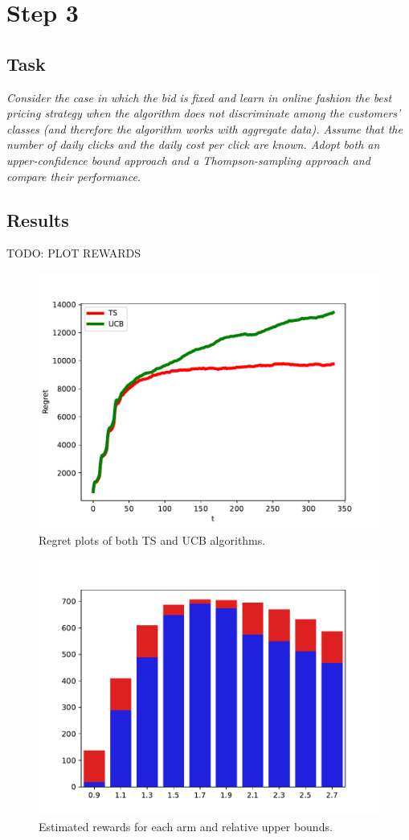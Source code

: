 \documentclass[12pt,a4paper]{report}
\begin{document}
		\section{Step 3}
			\subsection{Task}
\textit{Consider the case in which the bid is fixed and learn in online fashion the best pricing strategy when the algorithm does not discriminate among the customers’ classes (and therefore the algorithm works with aggregate data). Assume that the number of daily clicks and the daily cost per click are known. Adopt both an upper-confidence bound approach and a Thompson-sampling approach and compare their performance.}
			\subsection{Results}
TODO: PLOT REWARDS
\begin{figure}[H]
\centering
  \includegraphics[scale = 0.8, center]{3r}
  \caption{Regret plots of both TS and UCB algorithms.}
\end{figure}
\begin{figure}[H]
\centering
  \includegraphics[scale = 0.8, center]{3ucb}
  \caption{Estimated rewards for each arm and relative upper bounds.}
\end{figure}
\end{document}

